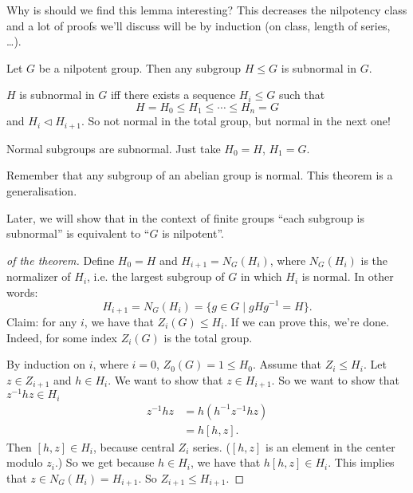 Why is should we find this lemma interesting? 
This decreases the nilpotency class and a lot of proofs we'll discuss will be by induction (on class, length of series, \ldots).

\begin{theorem}[16.2.2]
    Let $G$ be a nilpotent group. 
    Then any subgroup $H \le G$ is subnormal in $G$.
\end{theorem}
\begin{definition}[Subnormal]
    $H$ is  subnormal in $G$ iff there exists a sequence $H_i \le G$ such that
    \[
    H = H_0 \le  H_1 \le  \cdots \le  H_n = G
    \] 
    and $H_i \triangleleft H_{i+1}$. So not normal in the total group, but normal in the next one!
\end{definition}
\begin{lemma}
    Normal subgroups are subnormal. Just take $ H_0 = H$, $ H_1 = G$.
\end{lemma}

Remember that any subgroup of an abelian group is normal.
This theorem is a generalisation.

Later, we will show that in the context of finite groups ``each subgroup is subnormal'' is equivalent to ``$G$ is nilpotent''.


\begin{proof}[of the theorem]
    Define $ H_0 = H$ and $H_{i+1} = N_G(H_i)$, where $N_G(H_i)$ is the normalizer of $H_i$, i.e. the largest subgroup of $G$ in which $H_i$ is normal. In other words:
     \[
         H_{i+1} = N_G(H_i) = \{g \in G  \mid  gH g ^{-1} = H\} 
    .\] 
    Claim: for any $i$, we have that  $Z_i(G) \le  H_i$.
    If we can prove this, we're done. 
    Indeed, for some index $Z_i(G)$ is the total group.

    By induction on  $i$, where  $i= 0$,  $Z_0(G) = 1 \le  H_0$.
    Assume that $Z_i \le H_i$.
    Let $z \in Z_{i+1}$ and $h \in H_i$.
    We want to show that $z \in H_{i+1}$.
    So we want to show that $z^{-1} h z \in H_{i}$
    \begin{align*}
        z^{-1} h z &= h (h^{-1} z^{-1} h z)\\
                   &= h [h, z]
    .\end{align*} 
    Then $[h, z] \in H_{i}$, because central $Z_i$ series.
    ($[h, z]$ is an element in the center modulo $z_i$.)
    So we get because $h \in H_i$, we have that $h [h, z] \in H_i$.
    This implies that $z \in N_G(H_i) = H_{i+1}$.
    So $Z_{i+1} \le H_{i+1}$.
\end{proof}

